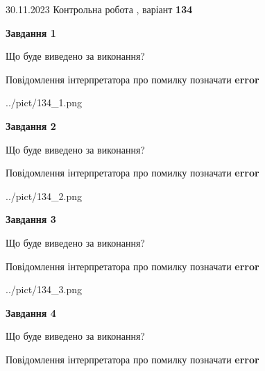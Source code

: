 \documentclass[12pt, ukrainian]{article}
\begin{document}
{{30.11.2023 Контрольна робота , варіант  \No \textbf { 134 }\par}}
{




{\begin {center}\textbf{Завдання 1}\end {center}}\par
Що буде виведено за виконання? \par
Повідомлення інтерпретатора про помилку позначати \textbf{error}

\begin{center}
	{../pict/134_1.png}
\end{center}
\newpage

{\begin {center}\textbf{Завдання 2}\end {center}}\par
Що буде виведено за виконання? \par
Повідомлення інтерпретатора про помилку позначати \textbf{error}

\begin{center}
	{../pict/134_2.png}
\end{center}
\newpage

{\begin {center}\textbf{Завдання 3}\end {center}}\par
Що буде виведено за виконання? \par
Повідомлення інтерпретатора про помилку позначати \textbf{error}

\begin{center}
	{../pict/134_3.png}
\end{center}
\newpage

{\begin {center}\textbf{Завдання 4}\end {center}}\par
Що буде виведено за виконання? \par
Повідомлення інтерпретатора про помилку позначати \textbf{error}

}
\end{document}
